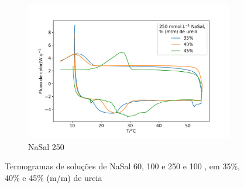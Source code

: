 \begin{figure}
	\hspace{4cm} \begin{subfigure}{0.5\textwidth}
		\centering
		\includegraphics[width=\textwidth]{./imagens/dsc/NaSal250}
		\caption{NaSal 250 \mM}
		\label{fig:DSC_NaSal250}
	\end{subfigure}

	\caption{Termogramas de soluções de NaSal 60, 100 e 250 \mM{} e \CTAB{} 100 \mM{}, em 35\%, 40\% e 45\% (m/m) de ureia}
	\label{fig:DSC_NaSals}  %

\end{figure}

%	
%	
%

		
	
